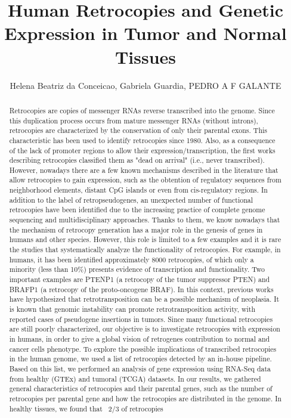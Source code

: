\documentclass[twoside]{article}
\title{\vspace{-15mm}\fontsize{24pt}{10pt}\selectfont\textbf{ Human Retrocopies and Genetic Expression in Tumor and Normal Tissues }} %
\author{ Helena Beatriz da Conceicao, Gabriela Guardia, PEDRO A F GALANTE }
\affil{ Instituto de Ensino e Pesquisa - Hospital S\'{\i}rio Liban\^es }
\date{}
\begin{document}
  
  
  \maketitle %
  
  
  \thispagestyle{fancy} %
  
  
  \begin{abstract}
  Retrocopies are copies of messenger RNAs reverse transcribed into the genome. Since this duplication process occurs from mature messenger RNAs (without introns),  retrocopies are characterized by the conservation of only their parental exons. This characteristic has been used to identify retrocopies since 1980. Also,  as a consequence of the lack of promoter regions to allow their expression/transcription,  the first works describing retrocopies classified them as "dead on arrival" (i.e.,  never transcribed). However,  nowadays there are a few known mechanisms described in the literature that allow retrocopies to gain expression,  such as the obtention of regulatory sequences from neighborhood elements,  distant CpG islands or even from cis-regulatory regions. In addition to the label of retropseudogenes,  an unexpected number of functional retrocopies have been identified due to the increasing practice of complete genome sequencing and multidisciplinary approaches. Thanks to them,  we know nowadays that the mechanism of retrocopy generation has a major role in the genesis of genes in humans and other species. However,  this role is limited to a few examples and it is rare the studies that systematically analyze the functionality of retrocopies. For example,  in humans,  it has been identified approximately  8000 retrocopies,  of which only a minority (less than 10\%) presents evidence of transcription and functionality. Two important examples are PTENP1 (a retrocopy of the tumor suppressor PTEN) and BRAFP1 (a retrocopy of the proto-oncogene BRAF). In this context,  previous works have hypothesized that retrotransposition can be a possible mechanism of neoplasia. It is known that genomic instability can promote retrotransposition activity,  with reported cases of pseudogene insertions in tumors. Since many functional retrocopies are still poorly characterized,  our objective is to investigate retrocopies with expression in humans,  in order to give a global vision of retrogenes contribution to normal and cancer cells phenotype. To explore the possible implications of transcribed retrocopies in the human genome,  we used a list of retrocopies detected by an in-house pipeline. Based on this list,  we performed an analysis of gene expression using RNA-Seq data from healthy (GTEx) and tumoral (TCGA) datasets. In our results,  we gathered general characteristics of retrocopies and their parental genes,  such as the number of retrocopies per parental gene and how the retrocopies are distributed in the genome. In healthy tissues,   we found that ~2/3 of retrocopies 
\end{abstract}
\end{document}
